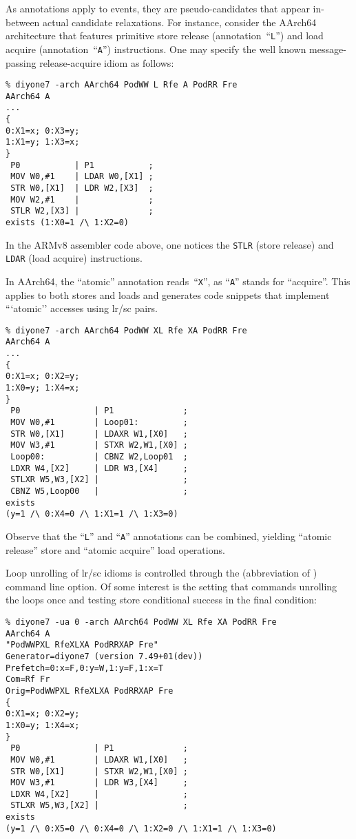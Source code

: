 As annotations apply to events, they are  pseudo-candidates that
appear in-between actual candidate relaxations. For instance, consider
the AArch64 architecture that features primitive store release
(annotation~``\texttt{L}'')
and load acquire (annotation~``\texttt{A}'') instructions.
One may specify the well known message-passing
release-acquire idiom as follows:
\begin{verbatim}
% diyone7 -arch AArch64 PodWW L Rfe A PodRR Fre
AArch64 A
...
{
0:X1=x; 0:X3=y;
1:X1=y; 1:X3=x;
}
 P0           | P1           ;
 MOV W0,#1    | LDAR W0,[X1] ;
 STR W0,[X1]  | LDR W2,[X3]  ;
 MOV W2,#1    |              ;
 STLR W2,[X3] |              ;
exists (1:X0=1 /\ 1:X2=0)
\end{verbatim}
In the ARMv8 assembler code above, one notices the \texttt{STLR} (store release)
and \texttt{LDAR} (load acquire) instructions.

In AArch64, the ``atomic'' annotation reads~``\texttt{X}'', as ``\texttt{A}''
stands for ``acquire''. This applies to both stores and loads and generates
code snippets that implement ```atomic'' accesses using
lr/sc pairs.
\begin{verbatim}
% diyone7 -arch AArch64 PodWW XL Rfe XA PodRR Fre
AArch64 A
...
{
0:X1=x; 0:X2=y;
1:X0=y; 1:X4=x;
}
 P0               | P1              ;
 MOV W0,#1        | Loop01:         ;
 STR W0,[X1]      | LDAXR W1,[X0]   ;
 MOV W3,#1        | STXR W2,W1,[X0] ;
 Loop00:          | CBNZ W2,Loop01  ;
 LDXR W4,[X2]     | LDR W3,[X4]     ;
 STLXR W5,W3,[X2] |                 ;
 CBNZ W5,Loop00   |                 ;
exists
(y=1 /\ 0:X4=0 /\ 1:X1=1 /\ 1:X3=0)
\end{verbatim}
Observe that the ``\texttt{L}'' and ``\texttt{A}'' annotations can
be combined, yielding ``atomic release'' store and ``atomic acquire'' load
operations.


\label{unroll:example}Loop unrolling of lr/sc idioms is controlled
through the  (abbreviation of ) command line option. Of some interest is the setting  that commands unrolling the loops once and
testing store conditional  success in the final condition:
\begin{verbatim}
% diyone7 -ua 0 -arch AArch64 PodWW XL Rfe XA PodRR Fre
AArch64 A
"PodWWPXL RfeXLXA PodRRXAP Fre"
Generator=diyone7 (version 7.49+01(dev))
Prefetch=0:x=F,0:y=W,1:y=F,1:x=T
Com=Rf Fr
Orig=PodWWPXL RfeXLXA PodRRXAP Fre
{
0:X1=x; 0:X2=y;
1:X0=y; 1:X4=x;
}
 P0               | P1              ;
 MOV W0,#1        | LDAXR W1,[X0]   ;
 STR W0,[X1]      | STXR W2,W1,[X0] ;
 MOV W3,#1        | LDR W3,[X4]     ;
 LDXR W4,[X2]     |                 ;
 STLXR W5,W3,[X2] |                 ;
exists
(y=1 /\ 0:X5=0 /\ 0:X4=0 /\ 1:X2=0 /\ 1:X1=1 /\ 1:X3=0)
\end{verbatim}


